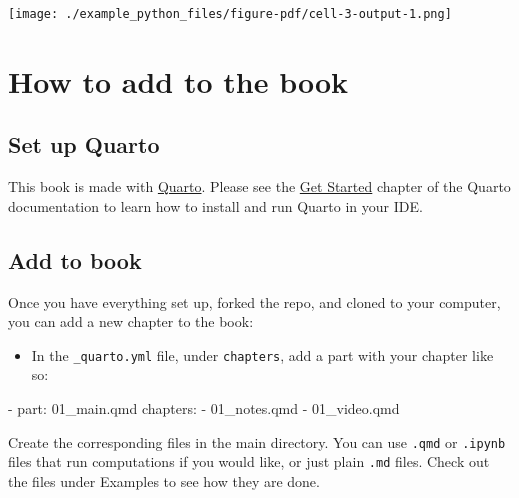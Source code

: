 \documentclass[
  letterpaper,
  DIV=11,
  numbers=noendperiod]{scrreprt}
\newenvironment{Shaded}{\begin{snugshade}}{\end{snugshade}}
\newcommand{\AttributeTok}[1]{\textcolor[rgb]{0.40,0.46,0.14}{#1}}
\newcommand{\AttributeTok}[1]{\textcolor[rgb]{0.00,0.48,0.65}{#1}}
\newcommand{\FunctionTok}[1]{\textcolor[rgb]{0.28,0.35,0.67}{#1}}
\newcommand{\KeywordTok}[1]{\textcolor[rgb]{0.00,0.46,0.62}{#1}}
\newcommand{\FunctionTok}[1]{\textcolor[rgb]{0.28,0.35,0.67}{#1}}
\newcommand{\KeywordTok}[1]{\textcolor[rgb]{0.00,0.48,0.65}{#1}}
\providecommand{\tightlist}{%
  \setlength{\itemsep}{0pt}\setlength{\parskip}{0pt}}
\begin{document}
\begin{Shaded}
\begin{Highlighting}[]
\texttt{[image: ./example\_python\_files/figure-pdf/cell-3-output-1.png]}

\appendix
{}

\hypertarget{how-to-add-to-the-book}{%
\chapter*{How to add to the book}\label{how-to-add-to-the-book}}

\hypertarget{set-up-quarto}{%
\section*{Set up Quarto}\label{set-up-quarto}}

This book is made with \href{https://quarto.org/}{Quarto}. Please see
the \href{https://quarto.org/docs/get-started/}{Get Started} chapter of
the Quarto documentation to learn how to install and run Quarto in your
IDE.

\hypertarget{add-to-book}{%
\section*{Add to book}\label{add-to-book}}

Once you have everything set up, forked the repo, and cloned to your
computer, you can add a new chapter to the book:

\begin{itemize}
\tightlist
\item
  In the \texttt{\_quarto.yml} file, under \texttt{chapters}, add a part
  with your chapter like so:
\end{itemize}

\begin{Shaded}
\begin{Highlighting}[]
\AttributeTok{  }\KeywordTok{{-}}\AttributeTok{ }\FunctionTok{part}\KeywordTok{:}\AttributeTok{ 01\_main.qmd}
\AttributeTok{      }\FunctionTok{chapters}\KeywordTok{:}\AttributeTok{ }
\AttributeTok{      }\KeywordTok{{-}}\AttributeTok{ 01\_notes.qmd}
\AttributeTok{      }\KeywordTok{{-}}\AttributeTok{ 01\_video.qmd}
\end{Highlighting}
\end{Shaded}

Create the corresponding files in the main directory. You can use
\texttt{.qmd} or \texttt{.ipynb} files that run computations if you
would like, or just plain \texttt{.md} files. Check out the files under
Examples to see how they are done.


\end{Highlighting}
\end{Shaded}
\end{document}

